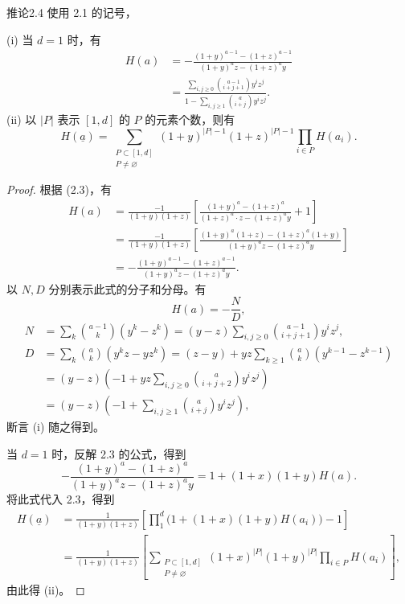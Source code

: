 \begin{SGAresult}{推论}{2.4}
使用 2.1 的记号，

(i) 当 $d=1$ 时，有
\[
\begin{aligned}
H(a)&=-\frac{(1+y)^{a-1}-(1+z)^{a-1}}{(1+y)^az-(1+z)^ay}\\
&=\frac{\displaystyle\sum_{i,j\geq0}\binom{a-1}{i+j+1}y^iz^j}{\displaystyle1-\sum_{i,j\geq1}\binom{a}{i+j}y^iz^j}.
\end{aligned}
\]
(ii) 以 $|P|$ 表示 $[1,d]$ 的 $P$ 的元素个数，则有
\[
H(\underline a)=\sum_{\substack{P\subset[1,d]\\P\ne\varnothing}}(1+y)^{|P|-1}(1+z)^{|P|-1}\prod_{i\in P}H(a_i).
\]
\end{SGAresult}
\begin{proof}
根据 (2.3)，有
\[
\begin{aligned}
H(a)&=\frac{-1}{(1+y)(1+z)}\left[\frac{(1+y)^a-(1+z)^a}{(1+z)^a\cdot z-(1+z)^ay}+1\right]\\
&=\frac{-1}{(1+y)(1+z)}\left[\frac{(1+y)^a(1+z)-(1+z)^a(1+y)}{(1+y)^az-(1+z)^ay}\right]\\
&=-\frac{(1+y)^{a-1}-(1+z)^{a-1}}{(1+y)^az-(1+z)^ay}.
\end{aligned}
\]
以 $N,D$ 分别表示此式的分子和分母。有
\[
 H(a)=-\frac ND,
\]
\[
\begin{aligned}
N&=\sum_k\binom{a-1}{k}(y^k-z^k)
=(y-z)\sum_{i,j\geq0}\binom{a-1}{i+j+1}y^iz^j,\\
D&=\sum_k\binom ak(y^kz-yz^k)
=(z-y)+yz\sum_{k\geq1}\binom ak(y^{k-1}-z^{k-1})\\
&=(y-z)\left(-1+yz\sum_{i,j\geq0}\binom a{i+j+2}y^iz^j\right)\\
&=(y-z)\left(-1+\sum_{i,j\geq1}\binom a{i+j}y^iz^j\right),
\end{aligned}
\]
断言 (i) 随之得到。

当 $d=1$ 时，反解 2.3 的公式，得到
\[
-\frac{(1+y)^a-(1+z)^a}{(1+y)^az-(1+z)^ay}=1+(1+x)(1+y)H(a).
\]
将此式代入 2.3，得到
\[
\begin{aligned}
H(\underline a)
&=\frac1{(1+y)(1+z)}\left[\prod_1^d\bigl(1+(1+x)(1+y)H(a_i)\bigr)-1\right]\\
&=\frac1{(1+y)(1+z)}\left[\sum_{\substack{P\subset[1,d]\\P\ne\varnothing}}(1+x)^{|P|}(1+y)^{|P|}\prod_{i\in P}H(a_i)\right],
\end{aligned}
\]
由此得 (ii)。
\end{proof}

